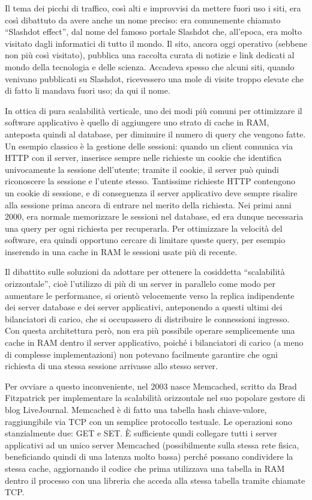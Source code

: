 Il tema dei picchi di traffico, così alti e improvvisi da mettere fuori uso i siti,
era così dibattuto da avere anche un nome preciso: era comunemente chiamato ``Slashdot
effect'', dal nome del famoso portale Slashdot che, all'epoca, era molto visitato dagli
informatici di tutto il mondo. Il sito, ancora oggi operativo (sebbene non più così
visitato), pubblica una raccolta curata di notizie e link dedicati al mondo della tecnologia
e delle scienza. Accadeva spesso che alcuni siti, quando venivano pubblicati su Slashdot,
ricevessero una mole di visite troppo elevate che di fatto li mandava fuori uso; da qui
il nome.

In ottica di pura scalabilità verticale, uno dei modi più comuni per ottimizzare il software
applicativo è quello di aggiungere uno strato di cache in RAM, anteposta quindi al database, per
diminuire il numero di query che vengono fatte. Un esempio classico è la gestione delle sessioni:
quando un client comunica via HTTP con il server, inserisce sempre nelle richieste un cookie che
identifica univocamente la sessione dell'utente; tramite il cookie, il server può quindi riconoscere
la sessione e l'utente stesso. Tantissime richieste HTTP contengono un cookie di sessione, e di
conseguenza il server applicativo deve sempre risalire alla sessione prima ancora di entrare nel
merito della richiesta. Nei primi anni 2000, era normale memorizzare le sessioni nel database, ed
era dunque necessaria una query per ogni richiesta per recuperarla. Per ottimizzare la velocità del
software, era quindi opportuno cercare di limitare queste query, per esempio inserendo in una cache
in RAM le sessioni usate più di recente.

Il dibattito sulle soluzioni da adottare per ottenere la cosiddetta ``scalabilità orizzontale'',
cioè l'utilizzo di più di un server in parallelo come modo per aumentare le performance, si orientò
velocemente verso la replica indipendente dei server database e dei server applicativi, anteponendo
a questi ultimi dei bilanciatori di carico, che si occupassero di distribuire le connessioni
ingresso. Con questa architettura però, non era più possibile operare semplicemente una cache in RAM
dentro il server applicativo, poiché i bilanciatori di carico (a meno di complesse implementazioni)
non potevano facilmente garantire che ogni richiesta di una stessa sessione arrivasse allo stesso
server.

Per ovviare a questo inconveniente, nel 2003 nasce Memcached, scritto da Brad Fitzpatrick per
implementare la scalabilità orizzontale nel suo popolare gestore di blog LiveJournal. Memcached è di
fatto una tabella hash chiave-valore, raggiungibile via TCP con un semplice protocollo testuale. Le
operazioni sono stanzialmente due: GET e SET. È sufficiente qundi collegare tutti i server
applicativi ad un unico server Memcached (possibilmente sulla stessa rete fisica, beneficiando
quindi di una latenza molto bassa) perché possano condividere la stessa cache, aggiornando il codice
che prima utilizzava una tabella in RAM dentro il processo con una libreria che acceda alla stessa
tabella tramite chiamate TCP.

